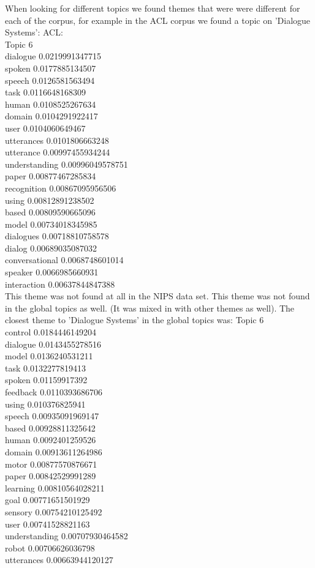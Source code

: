 \documentclass{article}
\begin{document}
{When looking for different topics we found themes that were were different for each of the corpus, for example in the ACL corpus we found a topic on 'Dialogue Systems':
ACL:\\
Topic 6\\
dialogue 0.0219991347715\\
spoken 0.0177885134507\\
speech 0.0126581563494\\
task 0.0116648168309\\
human 0.0108525267634\\
domain 0.0104291922417\\
user 0.0104060649467\\
utterances 0.0101806663248\\
utterance 0.00997455934244\\
understanding 0.00996049578751\\
paper 0.00877467285834\\
recognition 0.00867095956506\\
using 0.00812891238502\\
based 0.00809590665096\\
model 0.00734018345985\\
dialogues 0.00718810758578\\
dialog 0.00689035087032\\
conversational 0.0068748601014\\
speaker 0.0066985660931\\
interaction 0.00637844847388\\

This theme was not found at all in the NIPS data set. This theme was not found in the global topics as well.
(It was mixed in with other themes as well). The closest theme to 'Dialogue Systems' in the global topics was:
Topic 6\\
control 0.0184446149204\\
dialogue 0.0143455278516\\
model 0.0136240531211\\
task 0.0132277819413\\
spoken 0.01159917392\\
feedback 0.0110393686706\\
using 0.010376825941\\
speech 0.00935091969147\\
based 0.00928811325642\\
human 0.0092401259526\\
domain 0.00913611264986\\
motor 0.00877570876671\\
paper 0.00842529991289\\
learning 0.00810564028211\\
goal 0.00771651501929\\
sensory 0.00754210125492\\
user 0.00741528821163\\
understanding 0.00707930464582\\
robot 0.00706626036798\\
utterances 0.00663944120127\\

}
\end{document}

